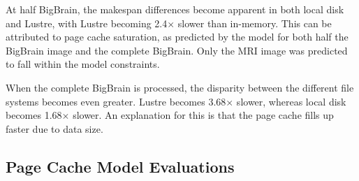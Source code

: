 At half BigBrain, the makespan differences become apparent in both local disk
and Lustre, with Lustre becoming 2.4$\times$ slower than in-memory. This can be
attributed to page cache saturation, as predicted by the model for both half the
BigBrain image and the complete BigBrain. Only the MRI image was predicted to
fall within the model constraints. 

When the complete BigBrain is processed, the disparity between the different
file systems becomes even greater. Lustre becomes 3.68$\times$ slower, whereas local
disk becomes 1.68$\times$ slower. An explanation for this is that the page cache fills
up faster due to data size.

\subsection{Page Cache Model Evaluations}
